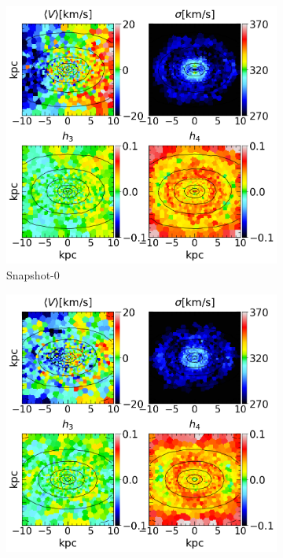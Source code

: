 \documentclass[english, oneside]{HYgradu}
\begin{document}
\begin{figure}
	\centering
	\begin{subfigure}[b]{0.49\textwidth}
		\includegraphics[width=\textwidth]{BH_0.png}
		\caption{Snapshot-0}
	\end{subfigure}
	\begin{subfigure}[b]{0.49\textwidth}
		\includegraphics[width=\textwidth]{BH_1.png}

\end{subfigure}
\end{figure}
\end{document}
